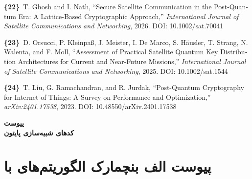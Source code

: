 \documentclass[a4paper,14pt]{extreport}
\begin{document}
\begin{latin}
\begin{flushleft}
\vspace{2pt}

\noindent\textbf{\{22\}}~T. Ghosh and I. Nath, ``Secure Satellite Communication in the Post-Quantum Era: A Lattice-Based Cryptographic Approach,'' \textit{International Journal of Satellite Communications and Networking}, 2026. DOI: 10.1002/sat.70041

\vspace{2pt}

\noindent\textbf{\{23\}}~D. Orsucci, P. Kleinpa{\ss}, J. Meister, I. De Marco, S. H\"ausler, T. Strang, N. Walenta, and F. Moll, ``Assessment of Practical Satellite Quantum Key Distribution Architectures for Current and Near-Future Missions,'' \textit{International Journal of Satellite Communications and Networking}, 2025. DOI: 10.1002/sat.1544

\vspace{2pt}

\noindent\textbf{\{24\}}~T. Liu, G. Ramachandran, and R. Jurdak, ``Post-Quantum Cryptography for Internet of Things: A Survey on Performance and Optimization,'' \textit{arXiv:2401.17538}, 2023. DOI: 10.48550/arXiv.2401.17538

\vspace{2pt}

\end{flushleft}
\end{latin}

\newpage
\appendix
{}

\begin{center}
{\Large\bfseries پیوست}\\[0.4cm]
{\large\bfseries کدهای شبیه‌سازی پایتون}
\end{center}

\vspace{0.5cm}

\section*{پیوست الف بنچمارک الگوریتم‌های  با }
\end{document}
